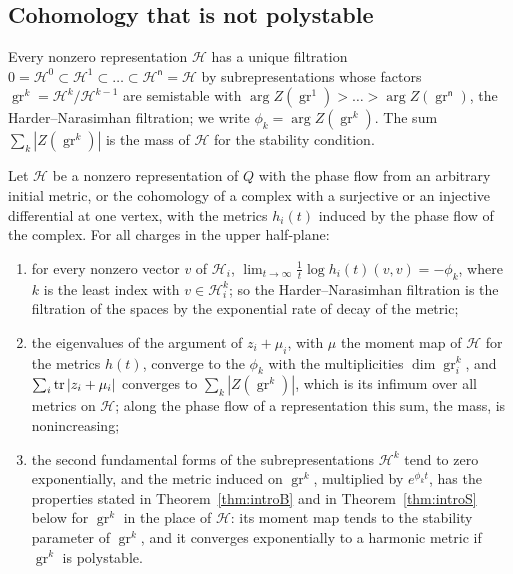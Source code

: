 \subsection{Cohomology that is not polystable}
Every nonzero representation $\mathcal H$ has a unique filtration
$0=\mathcal H^0\subset\mathcal H^1\subset\dots\subset\mathcal H^{\mathsf n}=\mathcal H$
by subrepresentations whose factors
$\operatorname{gr}^k=\mathcal H^k/\mathcal H^{k-1}$ are semistable with
$\arg Z(\operatorname{gr}^1)>\dots>\arg Z(\operatorname{gr}^{\mathsf n})$,
the Harder--Narasimhan filtration; we write
$\phi_k=\arg Z(\operatorname{gr}^k)$. The sum
$\sum_k|Z(\operatorname{gr}^k)|$ is the mass of $\mathcal H$ for the stability
condition.

\begin{theorem}\label{thm:introH}
Let $\mathcal H$ be a nonzero representation of $Q$ with the phase flow from
an arbitrary initial metric, or the cohomology of a complex with a surjective
or an injective differential at one vertex, with the metrics $h_i(t)$ induced
by the phase flow of the complex. For all charges in the upper half-plane:
\begin{enumerate}
\item[(i)] for every nonzero vector $v$ of $\mathcal H_i$,
 $\lim_{t\to\infty}\frac1t\log h_i(t)(v,v)=-\phi_k$, where $k$ is the least
 index with $v\in\mathcal H^k_i$; so the Harder--Narasimhan filtration is the
 filtration of the spaces by the exponential rate of decay of the metric;
\item[(ii)] the eigenvalues of the argument of $z_i+\mu_i$, with $\mu$ the
 moment map of $\mathcal H$ for the metrics $h(t)$, converge to the $\phi_k$
 with the multiplicities $\dim\operatorname{gr}^k_i$, and
 $\sum_i\operatorname{tr}|z_i+\mu_i|$ converges to $\sum_k|Z(\operatorname{gr}^k)|$, which
 is its infimum over all metrics on $\mathcal H$; along the phase flow of a
 representation this sum, the mass, is nonincreasing;
\item[(iii)] the second fundamental forms of the subrepresentations
 $\mathcal H^k$ tend to zero exponentially, and the metric induced on
 $\operatorname{gr}^k$, multiplied by $e^{\phi_kt}$, has the properties
 stated in Theorem~\ref{thm:introB} and in Theorem~\ref{thm:introS} below
 for $\operatorname{gr}^k$ in the place of $\mathcal H$: its moment map
 tends to the stability parameter of $\operatorname{gr}^k$, and it converges
 exponentially to a harmonic metric if $\operatorname{gr}^k$ is polystable.
\end{enumerate}
\end{theorem}

